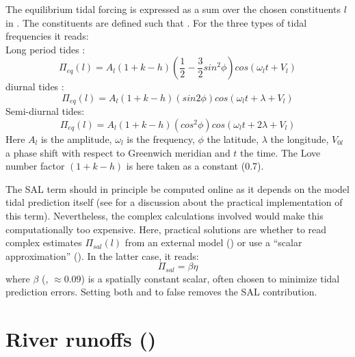 \documentclass[../main/NEMO_manual]{subfiles}
\begin{document}
The equilibrium tidal forcing is expressed as a sum over the chosen constituents $l$ in .
The constituents are defined such that .
For the three types of tidal frequencies it reads: \\
Long period tides :
\[
  \Pi_{eq}(l)=A_{l}(1+k-h)(\frac{1}{2}-\frac{3}{2}sin^{2}\phi)cos(\omega_{l}t+V_{l})
\]
diurnal tides :
\[
  \Pi_{eq}(l)=A_{l}(1+k-h)(sin 2\phi)cos(\omega_{l}t+\lambda+V_{l})
\]
Semi-diurnal tides:
\[
  \Pi_{eq}(l)=A_{l}(1+k-h)(cos^{2}\phi)cos(\omega_{l}t+2\lambda+V_{l})
\]
Here $A_{l}$ is the amplitude, $\omega_{l}$ is the frequency, $\phi$ the latitude, $\lambda$ the longitude,
$V_{0l}$ a phase shift with respect to Greenwich meridian and $t$ the time.
The Love number factor $(1+k-h)$ is here taken as a constant (0.7).

The SAL term should in principle be computed online as it depends on the model tidal prediction itself
(see \citet{Arbic2004} for a discussion about the practical implementation of this term).
Nevertheless, the complex calculations involved would make this computationally too expensive.
Here, practical solutions are whether to read complex estimates $\Pi_{sal}(l)$ from an external model
() or use a ``scalar approximation'' ().
In the latter case, it reads:\\
\[
  \Pi_{sal} = \beta \eta
\]
where $\beta$ (, $\approx0.09$) is a spatially constant scalar,
often chosen to minimize tidal prediction errors.
Setting both  and  to false removes the SAL contribution.

\section{River runoffs (\protect{})}
\label{sec:SBC_rnf}


\end{document}
